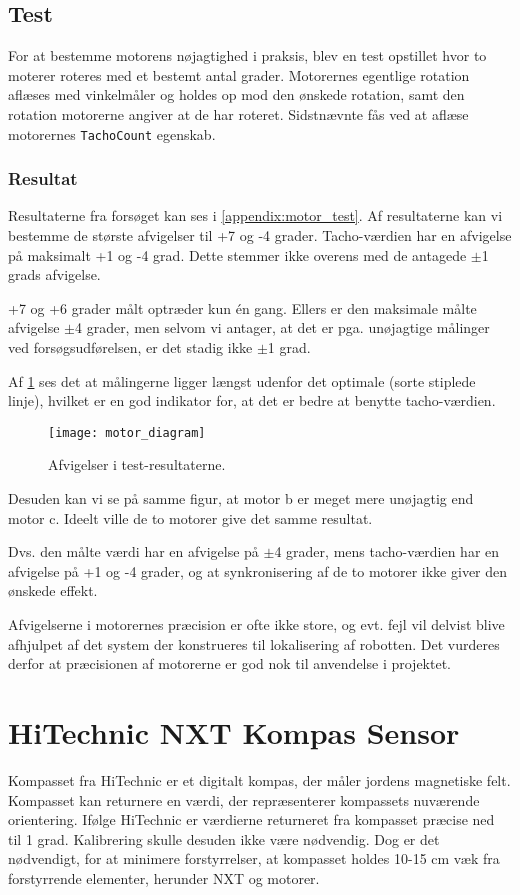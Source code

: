 \subsection{Test}
For at bestemme motorens nøjagtighed i praksis, blev en test opstillet hvor to moterer roteres med et bestemt antal grader.
Motorernes egentlige rotation aflæses med vinkelmåler og holdes op mod den ønskede rotation, samt den rotation motorerne angiver at de har roteret.
Sidstnævnte fås ved at aflæse motorernes \lstinline[style=csharp]!TachoCount! egenskab.

\subsubsection{Resultat}
Resultaterne fra forsøget kan ses i \cref{appendix:motor_test}. 
Af resultaterne kan vi bestemme de største afvigelser til +7 og -4 grader.
Tacho-værdien har en afvigelse på maksimalt +1 og -4 grad.
Dette stemmer ikke overens med de antagede $\pm$1 grads afvigelse.

+7 og +6 grader målt optræder kun \'en gang.
Ellers er den maksimale målte afvigelse $\pm$4 grader, men selvom vi antager, at det er pga. unøjagtige målinger ved forsøgsudførelsen, er det stadig ikke $\pm$1 grad.

Af \cref{sensor:motor_sensor_diagram} ses det at målingerne ligger længst udenfor det optimale (sorte stiplede linje), hvilket er en god indikator for, at det er bedre at benytte tacho-værdien.

\begin{figure}
\texttt{[image: motor\_diagram]}
\caption{Afvigelser i test-resultaterne.}
\label{sensor:motor_sensor_diagram}
\end{figure}

Desuden kan vi se på samme figur, at motor b er meget mere unøjagtig end motor c.
Ideelt ville de to motorer give det samme resultat.

Dvs. den målte værdi har en afvigelse på $\pm$4 grader, mens tacho-værdien har en afvigelse på +1 og -4 grader, og at synkronisering af de to motorer ikke giver den ønskede effekt.

Afvigelserne i motorernes præcision er ofte ikke store, og evt. fejl vil delvist blive afhjulpet af det system der konstrueres til lokalisering af robotten.
Det vurderes derfor at præcisionen af motorerne er god nok til anvendelse i projektet.

\section{HiTechnic NXT Kompas Sensor}
Kompasset fra HiTechnic er et digitalt kompas, der måler jordens magnetiske felt.
Kompasset kan returnere en værdi, der repræsenterer kompassets nuværende orientering.
Ifølge HiTechnic er værdierne returneret fra kompasset præcise ned til 1 grad.
Kalibrering skulle desuden ikke være nødvendig.
Dog er det nødvendigt, for at minimere forstyrrelser, at kompasset holdes 10-15 cm væk fra forstyrrende elementer, herunder \lego NXT og motorer.\cite{hitechnic_compass}

